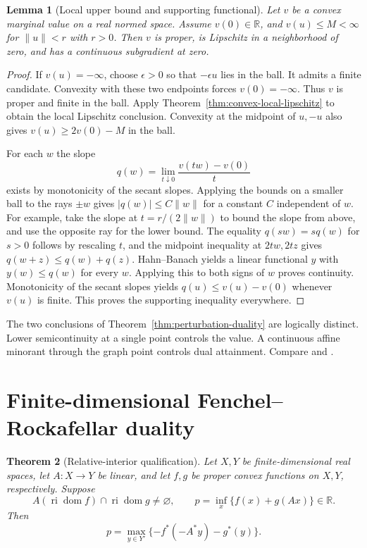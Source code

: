 \documentclass[11pt,oneside,openany]{book}
\newcommand{\R}{\mathbb R}
\theoremstyle{plain}
\newtheorem{theorem}{Theorem}[chapter]
\newtheorem{lemma}[theorem]{Lemma}
\theoremstyle{definition}
\theoremstyle{remark}
\begin{document}
\begin{lemma}[Local upper bound and supporting functional]\label{lem:local-value-support}
Let \(v\) be a convex marginal value on a real normed space.
Assume \(v(0)\in\R\), and \(v(u)\le M<\infty\) for
\(\|u\|<r\) with \(r>0\). Then \(v\) is proper, is
Lipschitz in a neighborhood of zero, and has a continuous
subgradient at zero.
\end{lemma}

\begin{proof}
If \(v(u)=-\infty\), choose \(\epsilon>0\) so that
\(-\epsilon u\) lies in the ball. It admits a finite candidate.
Convexity with these two endpoints forces \(v(0)=-\infty\).
Thus \(v\) is proper and finite in the ball. Apply
Theorem~\ref{thm:convex-local-lipschitz} to obtain the local
Lipschitz conclusion. Convexity at the midpoint of \(u,-u\)
also gives \(v(u)\ge 2v(0)-M\) in the ball.

For each \(w\) the slope
\[
 q(w)=\lim_{t\downarrow0}\frac{v(tw)-v(0)}{t}
\]
exists by monotonicity of the secant slopes. Applying the bounds
on a smaller ball to the rays \(\pm w\) gives
\(|q(w)|\le C\|w\|\) for a constant \(C\) independent of \(w\).
For example, take the slope at \(t=r/(2\|w\|)\) to bound
the slope from above, and use the opposite ray for the lower
bound. The equality \(q(sw)=s q(w)\) for \(s>0\) follows by
rescaling \(t\), and the midpoint inequality at \(2tw,2tz\)
gives \(q(w+z)\le q(w)+q(z)\). Hahn--Banach yields a linear
functional \(y\) with \(y(w)\le q(w)\) for every \(w\). Applying
this to both signs of \(w\) proves continuity. Monotonicity
of the secant slopes yields \(q(u)\le v(u)-v(0)\) whenever
\(v(u)\) is finite. This proves the supporting inequality
everywhere.
\end{proof}

The two conclusions of Theorem~\ref{thm:perturbation-duality}
are logically distinct. Lower semicontinuity at a single
point controls the value. A continuous affine minorant
through the graph point controls dual attainment.
Compare \cite[Chapter III, Section 2]{EkelandTemam}
and \cite[Sections 29--30]{Rockafellar}.

\section{Finite-dimensional Fenchel--Rockafellar duality}
\label{v04-02}

\begin{theorem}[Relative-interior qualification]\label{thm:finite-fenchel}
Let \(X,Y\) be finite-dimensional real spaces, let
\(A:X\to Y\) be linear, and let \(f,g\) be proper convex
functions on \(X,Y\), respectively. Suppose
\[
 A(\operatorname{ri}\operatorname{dom}f)
 \cap\operatorname{ri}\operatorname{dom}g\ne\varnothing,\qquad
 p=\inf_x \{f(x)+g(Ax)\}\in\R .
\]
Then
\begin{equation}\label{eq:fenchel-dual}
 p=\max_{y\in Y'}\{-f^*(-A^*y)-g^*(y)\}.
\end{equation}
\end{theorem}
\end{document}
